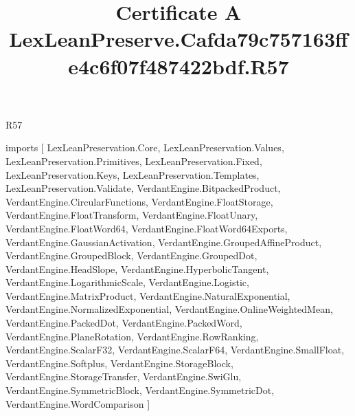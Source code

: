 \begin{lexlean}{R57}
\title{Certificate A LexLeanPreserve.Cafda79c757163ffe4c6f07f487422bdf.R57}
\begin{coremodule}
imports [
  LexLeanPreservation.Core,
  LexLeanPreservation.Values,
  LexLeanPreservation.Primitives,
  LexLeanPreservation.Fixed,
  LexLeanPreservation.Keys,
  LexLeanPreservation.Templates,
  LexLeanPreservation.Validate,
  VerdantEngine.BitpackedProduct,
  VerdantEngine.CircularFunctions,
  VerdantEngine.FloatStorage,
  VerdantEngine.FloatTransform,
  VerdantEngine.FloatUnary,
  VerdantEngine.FloatWord64,
  VerdantEngine.FloatWord64Exports,
  VerdantEngine.GaussianActivation,
  VerdantEngine.GroupedAffineProduct,
  VerdantEngine.GroupedBlock,
  VerdantEngine.GroupedDot,
  VerdantEngine.HeadSlope,
  VerdantEngine.HyperbolicTangent,
  VerdantEngine.LogarithmicScale,
  VerdantEngine.Logistic,
  VerdantEngine.MatrixProduct,
  VerdantEngine.NaturalExponential,
  VerdantEngine.NormalizedExponential,
  VerdantEngine.OnlineWeightedMean,
  VerdantEngine.PackedDot,
  VerdantEngine.PackedWord,
  VerdantEngine.PlaneRotation,
  VerdantEngine.RowRanking,
  VerdantEngine.ScalarF32,
  VerdantEngine.ScalarF64,
  VerdantEngine.SmallFloat,
  VerdantEngine.Softplus,
  VerdantEngine.StorageBlock,
  VerdantEngine.StorageTransfer,
  VerdantEngine.SwiGlu,
  VerdantEngine.SymmetricBlock,
  VerdantEngine.SymmetricDot,
  VerdantEngine.WordComparison
]


\end{coremodule}
\end{lexlean}
